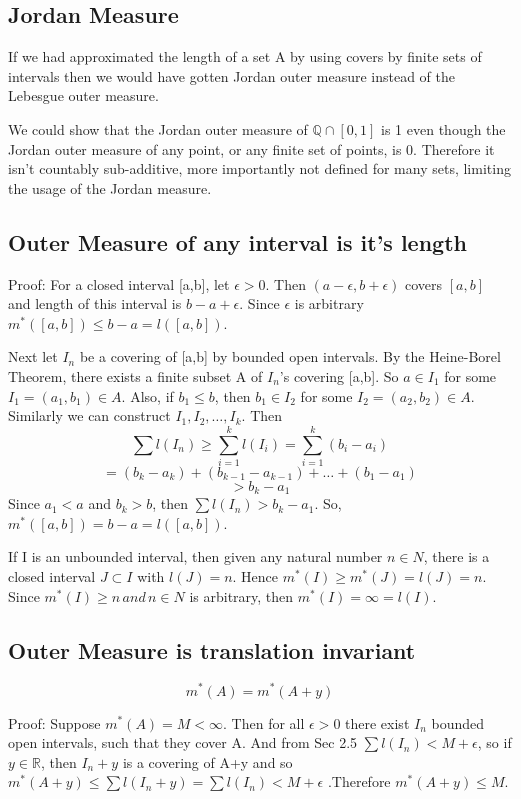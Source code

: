 \documentclass{article}
\begin{document}
\subsection{Jordan Measure}

If we had approximated the length of a set A by using covers by finite sets of intervals then we would have gotten Jordan outer measure instead of the Lebesgue outer measure. 

We could show that the Jordan outer measure of $ \mathbb{Q} \cap[0,1]$ is 1 even though the Jordan outer measure of any point, or any finite set of points, is 0. Therefore it isn't countably sub-additive, more importantly not defined for many sets, limiting the usage of the Jordan measure.

\subsection{Outer Measure of any interval is it's length}

Proof:  
For a closed interval [a,b], let $\epsilon >0$. Then $(a-\epsilon,b+\epsilon)$ covers $[a,b]$ and length of this interval is $b-a+\epsilon$. Since $\epsilon$ is arbitrary $m^*([a,b]) \leq b-a = l([a,b])$.\medskip

Next let ${I_n}$ be a covering of [a,b] by bounded open intervals. By the Heine-Borel Theorem, there exists a finite subset A of $I_n$'s covering [a,b]. So $a \in I_1$ for some $I_1 =(a_1,b_1) \in A$. Also, if $b_1 \leq b$, then $b_1 \in I_2 $ for some $I_2 =(a_2,b_2) \in A$. Similarly we can construct $I_1,I_2,\dots,I_k$. Then
$$ \sum l(I_n) \geq \sum_{i=1}^k l(I_i) = \sum_{i=1}^{k}(b_i - a_i)$$
$$=(b_k-a_k) +(b_{k-1} -a_{k-1})+ \dots + (b_1 - a_1) $$
$$ >b_k -a_1$$
Since $a_1<a$ and $b_k>b$, then $ \sum l(I_n) > b_k -a_1 $. So, $m^*([a,b]) = b-a = l([a,b])$.\medskip

If I is an unbounded interval, then given any natural number $n \in N$, there is a closed interval $J \subset I$ with $l(J)=n$. Hence $m^*(I) \geq m^*(J) = l(J)=n$. Since $m^*(I) \geq n \, and \, n \in N$ is arbitrary, then $m^*(I)=\infty=l(I)$. 

\subsection{Outer Measure is translation invariant}
$$m^*(A)=m^*(A+y)$$

Proof: Suppose $m^*(A) = M < \infty$. Then for all $\epsilon > 0 $ there exist ${I_n}$ bounded open intervals, such that they cover A. And from Sec 2.5 $\sum l(I_n) < M+ \epsilon$, so if $y \in \mathbb{R}$, then ${I_{n}+y}$ is a covering of A+y and so $m^{*}(A+y) \leq \sum l(I_n + y ) = \sum l(I_n) < M + \epsilon$ .Therefore $m^*(A+y) \leq M$.\medskip
\end{document}
